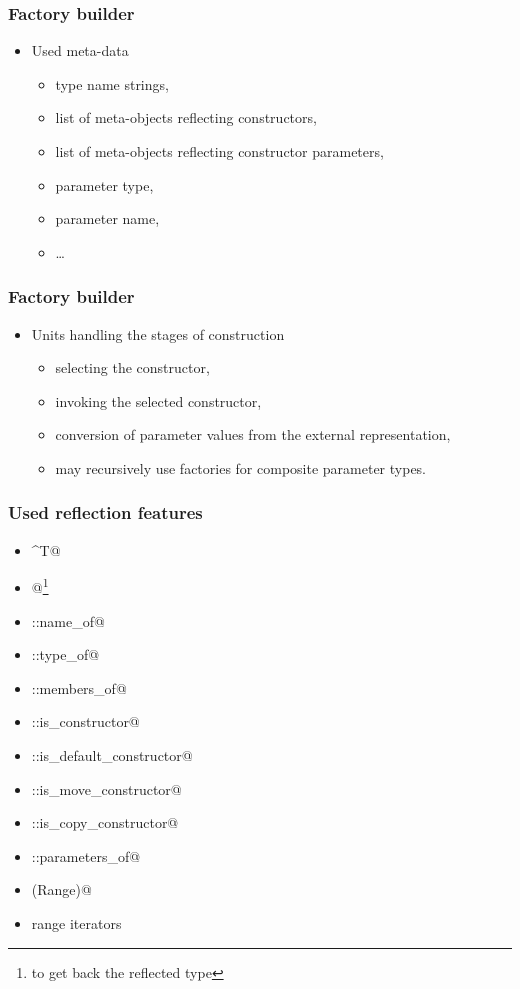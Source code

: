 \documentclass[compress,table,xcolor=table]{beamer}
\begin{document}
\begin{frame}
  \frametitle{Factory builder}
  \Huge
    \begin{itemize}
    \item{Used meta-data}
          \begin{itemize}
        \Large
        \item type name strings,
        \item list of meta-objects reflecting constructors,
        \item list of meta-objects reflecting constructor parameters,
        \item parameter type,
        \item parameter name,
        \item \ldots
          \end{itemize}
    \end{itemize}
\end{frame}
\begin{frame}
  \frametitle{Factory builder}
  \Huge
  \begin{itemize}
    \item{Units handling the stages of construction}
          \begin{itemize}
        \Large
        \item selecting the  constructor,
        \item invoking the selected constructor,
        \item conversion of parameter values from the external representation,
        \item may recursively use factories for composite parameter types.
        \end{itemize}
  \end{itemize}
\end{frame}
\begin{frame}[fragile]
  \frametitle{Used reflection features}
  \large
    \begin{itemize}
        \item \verb@^T@
        \item \verb@[: :]@\footnote{to get back the reflected type}
        \item \verb@meta::name_of@
        \item \verb@meta::type_of@
        \item \verb@meta::members_of@
        \item \verb@meta::is_constructor@
        \item \verb@meta::is_default_constructor@
        \item \verb@meta::is_move_constructor@
        \item \verb@meta::is_copy_constructor@
        \item \verb@meta::parameters_of@
        \item \verb@size(Range)@
        \item range iterators
    \end{itemize}
\end{frame}
\end{document}
